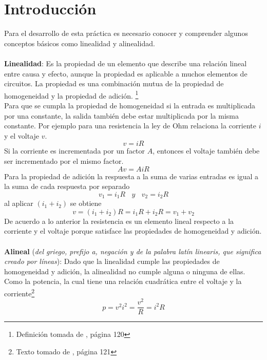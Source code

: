 \documentclass[twocolumn]{IEEEtran}
\begin{document}
\section{Introducción}
\noindent
Para el desarrollo de esta práctica es necesario conocer y comprender algunos conceptos básicos como linealidad y alinealidad.\\\\
\textbf{Linealidad}: Es la propiedad de un elemento que describe una relación lineal entre causa y efecto, aunque la propiedad es aplicable a muchos elementos de circuitos. La propiedad es una combinación mutua de la propiedad de homogeneidad y la propiedad de adición. \footnote{Definición tomada de \cite{sadiku}, página 120}\\
Para que se cumpla la propiedad de homogeneidad si la entrada es multiplicada por una constante, la salida también debe estar multiplicada por la misma constante. Por ejemplo para una resistencia la ley de Ohm relaciona la corriente $i$ y el voltaje $v$.
\begin{equation}
 v=iR
\label{equ1}
\end{equation}
\noindent
Si la corriente es incrementada por un factor $A$, entonces el voltaje también debe ser incrementado por el mismo factor.
\begin{equation}
 Av=AiR
\label{equ2}
\end{equation}
\noindent
Para la propiedad de adición la respuesta a la suma de varias entradas es igual a la suma de cada respuesta por separado
\begin{equation}
 v_1 = i_1R \ \ \ \ y \ \ \ \ v_2 = i_2R
\end{equation}
\noindent
al aplicar $( i_1 + i_2 )$ se obtiene
\begin{equation}
 v = ( i_1 + i_2 ) R = i_1 R + i_2 R = v_1 + v_2
\end{equation}
\noindent
De acuerdo a lo anterior la resistencia es un elemento lineal respecto a la corriente y el voltaje porque satisface las propiedades de homogeneidad y adición.\\\\
\textbf{Alineal} (\textit{del griego, prefijo a, negación y de la palabra latín linearis, que significa creado por líneas}): Dado que la linealidad cumple las propiedades de homogeneidad y adición, la alinealidad no cumple alguna o ninguna de ellas. Como la potencia, la cual tiene una relación cuadrática entre el voltaje y la corriente\footnote{Texto tomado de \cite{sadiku}, página 121}
\begin{equation}
 p = v^{2} i^{2} = \frac{v^{2}}{R} = i^{2} R
\label{equ3}
\end{equation}
\end{document}

